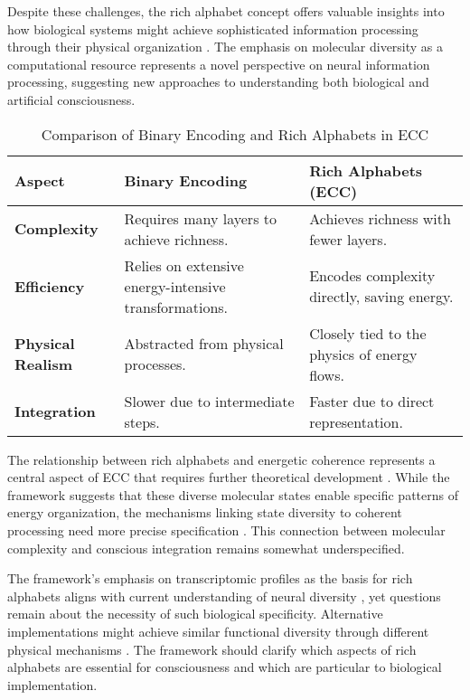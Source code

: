 Despite these challenges, the rich alphabet concept offers valuable insights into how biological systems might achieve sophisticated information processing through their physical organization \cite{chalmers2010character}. The emphasis on molecular diversity as a computational resource represents a novel perspective on neural information processing, suggesting new approaches to understanding both biological and artificial consciousness.

\begin{table}[h!]
\centering
\begin{tabularx}{\textwidth}{@{}lXl@{}}
\toprule
\textbf{Aspect}            & \textbf{Binary Encoding}                  & \textbf{Rich Alphabets (ECC)}         \\ \midrule
\textbf{Complexity}        & Requires many layers to achieve richness. & Achieves richness with fewer layers.  \\
\textbf{Efficiency}        & Relies on extensive energy-intensive transformations. & Encodes complexity directly, saving energy. \\
\textbf{Physical Realism}  & Abstracted from physical processes.       & Closely tied to the physics of energy flows. \\
\textbf{Integration}       & Slower due to intermediate steps.         & Faster due to direct representation.  \\ \bottomrule
\end{tabularx}
\caption{Comparison of Binary Encoding and Rich Alphabets in ECC}
\label{tab:binary_vs_rich}
\end{table}

The relationship between rich alphabets and energetic coherence represents a central aspect of ECC that requires further theoretical development \cite{deacon2011incomplete}. While the framework suggests that these diverse molecular states enable specific patterns of energy organization, the mechanisms linking state diversity to coherent processing need more precise specification \cite{koch2019feeling}. This connection between molecular complexity and conscious integration remains somewhat underspecified.

The framework's emphasis on transcriptomic profiles as the basis for rich alphabets aligns with current understanding of neural diversity \cite{rovelli2018order}, yet questions remain about the necessity of such biological specificity. Alternative implementations might achieve similar functional diversity through different physical mechanisms \cite{penrose2016fashion}. The framework should clarify which aspects of rich alphabets are essential for consciousness and which are particular to biological implementation.


